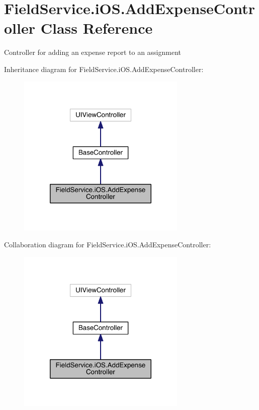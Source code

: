 \hypertarget{class_field_service_1_1i_o_s_1_1_add_expense_controller}{\section{Field\+Service.\+i\+O\+S.\+Add\+Expense\+Controller Class Reference}
\label{class_field_service_1_1i_o_s_1_1_add_expense_controller}
}


Controller for adding an expense report to an assignment  




Inheritance diagram for Field\+Service.\+i\+O\+S.\+Add\+Expense\+Controller\+:
\nopagebreak
\begin{figure}[H]
\begin{center}
\leavevmode
\includegraphics[width=228pt]{class_field_service_1_1i_o_s_1_1_add_expense_controller__inherit__graph}
\end{center}
\end{figure}


Collaboration diagram for Field\+Service.\+i\+O\+S.\+Add\+Expense\+Controller\+:
\nopagebreak
\begin{figure}[H]
\begin{center}
\leavevmode
\includegraphics[width=228pt]{class_field_service_1_1i_o_s_1_1_add_expense_controller__coll__graph}
\end{center}
\end{figure}
